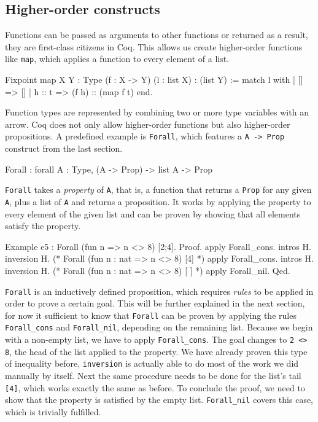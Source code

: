 \documentclass[paper = a4, fleqn, abstract=on, twoside]{scrreprt}
\newcommand{\coqinline}[1]{\texttt{#1}}
\begin{document}
\subsection{Higher-order constructs}
Functions can be passed as arguments to other functions or returned as a result, they are first-class citizens in Coq. This allows us create higher-order functions like \coqinline{map}, which applies a function to every element of a list.
\begin{coqcode}
Fixpoint map {X Y : Type} (f : X -> Y) (l : list X) : (list Y) :=
  match l with
  | []     => []
  | h :: t => (f h) :: (map f t)
  end.
\end{coqcode}
Function types are represented by combining two or more type variables with an arrow. Coq does not only allow higher-order functions but also higher-order propositions. A predefined example is \coqinline{Forall}, which features a \coqinline{A -> Prop} construct from the last section.
\begin{coqcode}
Forall : forall A : Type, (A -> Prop) -> list A -> Prop
\end{coqcode}
\coqinline{Forall} takes a \textit{property} of \coqinline{A}, that is, a function that returns a \coqinline{Prop} for any given \coqinline{A}, plus a list of \coqinline{A} and returns a proposition. It works by applying the property to every element of the given list and can be proven by showing that all elements satisfy the property.
\begin{coqcode}
Example e5 : Forall (fun n => n <> 8) [2;4].
Proof.
apply Forall_cons. intros H. inversion H.
(* Forall (fun n : nat => n <> 8) [4] *)
apply Forall_cons. intros H. inversion H.
(* Forall (fun n : nat => n <> 8) [ ] *)
apply Forall_nil.
Qed.
\end{coqcode}
\coqinline{Forall} is an inductively defined proposition, which requires \textit{rules} to be applied in order to prove a certain goal. This will be further explained in the next section, for now it sufficient to know that \coqinline{Forall} can be proven by applying the rules \coqinline{Forall_cons} and \coqinline{Forall_nil}, depending on the remaining list. Because we begin with a non-empty list, we have to apply \coqinline{Forall_cons}. The goal changes to \coqinline{2 <> 8}, the head of the list applied to the property. We have already proven this type of inequality before, \coqinline{inversion} is actually able to do most of the work we did manually by itself. Next the same procedure needs to be done for the list's tail \coqinline{[4]}, which works exactly the same as before. To conclude the proof, we need to show that the property is satisfied by the empty list. \coqinline{Forall_nil} covers this case, which is trivially fulfilled.
\end{document}
